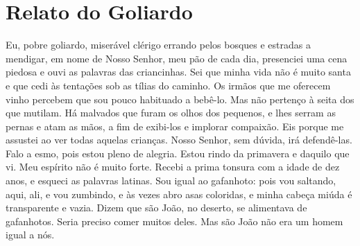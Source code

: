 \chapter{Relato do Goliardo}
Eu, pobre goliardo, miserável clérigo errando pelos bosques e estradas a
mendigar, em nome de Nosso Senhor, meu pão de cada dia, presenciei uma
cena piedosa e ouvi as palavras das criancinhas. Sei que minha vida não é
muito santa e que cedi às tentações sob as tílias do caminho. Os irmãos
que me oferecem vinho percebem que sou pouco habituado a bebê-lo. Mas não
pertenço à seita dos que mutilam. Há malvados que furam os olhos dos
pequenos, e lhes serram as pernas e atam as mãos, a fim de exibi-los e
implorar compaixão. Eis porque me assustei ao ver todas aquelas crianças.
Nosso Senhor, sem dúvida, irá defendê-las. Falo a esmo, pois estou pleno
de alegria. Estou rindo da primavera e daquilo que vi. Meu espírito não é
muito forte. Recebi a prima tonsura com a idade de dez anos, e esqueci as
palavras latinas. Sou igual ao gafanhoto: pois vou saltando, aqui, ali, e
vou zumbindo, e às vezes abro asas coloridas, e minha cabeça miúda é
transparente e vazia. Dizem que são João, no deserto, se alimentava de
gafanhotos. Seria preciso comer muitos deles. Mas são João não era um
homem igual a nós.

